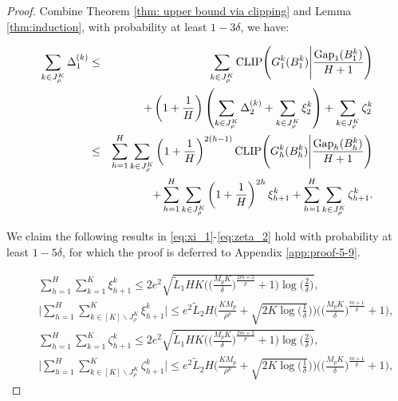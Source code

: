 \documentclass[final,supplement]{siamart251216}
\begin{document}
\begin{proof}

Combine Theorem \ref{thm: upper bound via clipping} and Lemma \ref{thm:induction}, with probability at least $1-3\delta$, we have:

\begin{eqnarray}\label{bound 4}
\sum_{k\in J_{\rho}^{K}}\Delta_{1}^{(k)}
&\leq&
\sum_{k\in J_{\rho}^{K}}
{\rm CLIP}\Bigg(
G_{1}^{k}(B_1^k)
\Bigg|
\frac{{\rm Gap}_{1}(B_1^k)}{H+1}
\Bigg)
\\
&&+
\left(1+\frac{1}{H}\right)
\left(
\sum_{k\in J_{\rho}^{K}}\Delta_{2}^{(k)}
+\sum_{k\in J_{\rho}^{K}}\xi_{2}^{k}
\right)
+\sum_{k\in J_{\rho}^{K}}\zeta_{2}^{k}
\nonumber\\
&\leq&
\sum_{h=1}^{H}\sum_{k\in J_{\rho}^{K}}
\left(1+\frac{1}{H}\right)^{2(h-1)}{\rm CLIP}\Bigg(
G_{h}^{k}(B_h^k)
\Bigg|
\frac{{\rm Gap}_{h}(B_h^k)}{H+1}
\Bigg)
\nonumber\\
&&+
\sum_{h=1}^{H}\sum_{k\in J_{\rho}^{K}}
\left(1+\frac{1}{H}\right)^{2h}\xi_{h+1}^{k}
+\sum_{h=1}^{H}\sum_{k\in J_{\rho}^{K}}\zeta_{h+1}^{k}.
\nonumber
\end{eqnarray}


We claim the following results in \eqref{eq:xi_1}-\eqref{eq:zeta_2} hold with probability at least $1-5\delta$, for which the proof is deferred to  Appendix \ref{app:proof-5-9}.

\begin{eqnarray}
&&\sum_{h=1}^{H}\sum_{k=1}^{K}\xi_{h+1}^{k}\leq 2e^{2}\sqrt{\widetilde{L}_{1}HK\Big(\Big(\frac{M_{p}K}{\delta}\Big)^{\frac{2m+2}{p}} +1\Big)\log\Big(\frac{2}{\delta}\Big)} , \label{eq:xi_1}\\
    && \Big|\sum_{h=1}^{H}\sum_{k\in [K]\backslash J_{\rho}^{K}}^{K}\xi_{h+1}^{k}\Big|\leq e^{2}\widetilde{L}_{2}H\Big(\frac{KM_{p}}{\rho^{p}}+\sqrt{2K\log(\frac{1}{\delta}})\Big)\Big(\Big(\frac{M_{p}K}{\delta}\Big)^{\frac{m+1}{p}} +1\Big),\label{eq:xi_2}\\  &&\sum_{h=1}^{H}\sum_{k=1}^{K}\zeta_{h+1}^{k}\leq 2e^{2}\sqrt{\widetilde{L}_{1}HK\Big(\Big(\frac{M_{p}K}{\delta}\Big)^{\frac{2m+2}{p}} +1\Big)\log\Big(\frac{2}{\delta}\Big)},\label{eq:zeta_1} \\
   && \Big|\sum_{h=1}^{H}\sum_{k\in [K]\backslash J_{\rho}^{K}}^{K}\zeta_{h+1}^{k}\Big|\leq e^{2}\widetilde{L}_{2}H\Big(\frac{KM_{p}}{\rho^{p}}+\sqrt{2K\log(\frac{1}{\delta}})\Big)\Big(\Big(\frac{M_{p}K}{\delta}\Big)^{\frac{m+1}{p}} +1\Big), \label{eq:zeta_2}
\end{eqnarray}


\end{proof}
\end{document}
